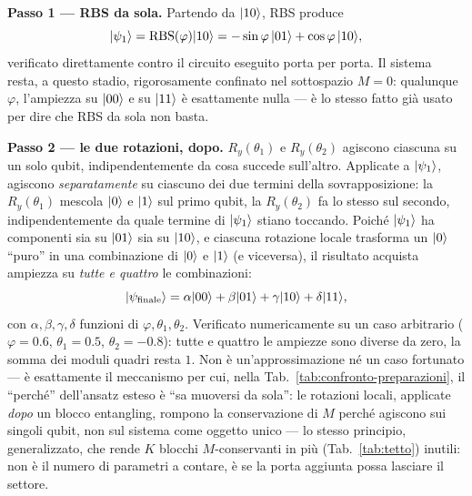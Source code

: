 \documentclass[11pt,a4paper]{article}
\begin{document}
\noindent\textbf{Passo 1 --- RBS da sola.} Partendo da $\lvert 10\rangle$, RBS produce
\begin{equation}
\lvert \psi_1\rangle = \mathrm{RBS}(\varphi)\lvert 10\rangle = -\sin\varphi\,\lvert 01\rangle +
\cos\varphi\,\lvert 10\rangle,
\end{equation}
verificato direttamente contro il circuito eseguito porta per porta. Il
sistema resta, a questo stadio, rigorosamente confinato nel sottospazio
$M=0$: qualunque $\varphi$, l'ampiezza su $\lvert 00\rangle$ e su $\lvert 11\rangle$ è
esattamente nulla --- è lo stesso fatto già usato per dire che RBS da sola
non basta.

\noindent\textbf{Passo 2 --- le due rotazioni, dopo.} $R_y(\theta_1)$ e
$R_y(\theta_2)$ agiscono ciascuna su un solo qubit, indipendentemente da
cosa succede sull'altro. Applicate a $\lvert \psi_1\rangle$, agiscono \emph{separatamente}
su ciascuno dei due termini della sovrapposizione: la $R_y(\theta_1)$ mescola
$\lvert 0\rangle$ e $\lvert 1\rangle$ sul primo qubit, la $R_y(\theta_2)$ fa lo stesso sul
secondo, indipendentemente da quale termine di $\lvert \psi_1\rangle$ stiano
toccando. Poiché $\lvert \psi_1\rangle$ ha componenti sia su $\lvert 01\rangle$ sia su
$\lvert 10\rangle$, e ciascuna rotazione locale trasforma un $\lvert 0\rangle$ ``puro'' in una
combinazione di $\lvert 0\rangle$ e $\lvert 1\rangle$ (e viceversa), il risultato acquista
ampiezza su \emph{tutte e quattro} le combinazioni:
\begin{equation}
\lvert \psi_{\rm finale}\rangle = \alpha\lvert 00\rangle + \beta\lvert 01\rangle + \gamma\lvert 10\rangle +
\delta\lvert 11\rangle,
\end{equation}
con $\alpha,\beta,\gamma,\delta$ funzioni di $\varphi,\theta_1,\theta_2$.
Verificato numericamente su un caso arbitrario ($\varphi=0.6$,
$\theta_1=0.5$, $\theta_2=-0.8$): tutte e quattro le ampiezze sono diverse
da zero, la somma dei moduli quadri resta $1$. Non è un'approssimazione né
un caso fortunato --- è esattamente il meccanismo per cui, nella Tab.~\ref{tab:confronto-preparazioni},
il ``perché'' dell'ansatz esteso è ``sa muoversi da sola'': le rotazioni
locali, applicate \emph{dopo} un blocco entangling, rompono la conservazione
di $M$ perché agiscono sui singoli qubit, non sul sistema come oggetto
unico --- lo stesso principio, generalizzato, che rende $K$ blocchi
$M$-conservanti in più (Tab.~\ref{tab:tetto}) inutili: non è il numero di
parametri a contare, è se la porta aggiunta possa lasciare il settore.
\end{document}
